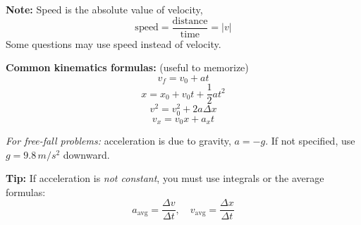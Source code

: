 \documentclass{article}
\begin{document}
\vspace{2mm}

\textbf{Note:} Speed is the absolute value of velocity,
\[
\text{speed} = \frac{\text{distance}}{\text{time}} = |v|
\]
Some questions may use speed instead of velocity.

\vspace{4mm}

\textbf{Common kinematics formulas:} (useful to memorize)
\[
v_f = v_0 + at
\]
\[
x = x_0 + v_0 t + \frac{1}{2} a t^2
\]
\[
v^2 = v_0^2 + 2a \Delta x
\]
\[
v_x = v_0 x + a_x t
\]

\vspace{2mm}

\textit{For free-fall problems:} acceleration is due to gravity, $a = -g$. If not specified, use $g = 9.8 \, m/s^2$ downward.

\vspace{4mm}

\colorbox{gray!20}{%
\parbox{\linewidth}{%
\textbf{Tip:} If acceleration is \textit{not constant}, you must use integrals or the average formulas:
\[
a_{\text{avg}} = \frac{\Delta v}{\Delta t}, \quad v_{\text{avg}} = \frac{\Delta x}{\Delta t}
\]
}}
\end{document}
